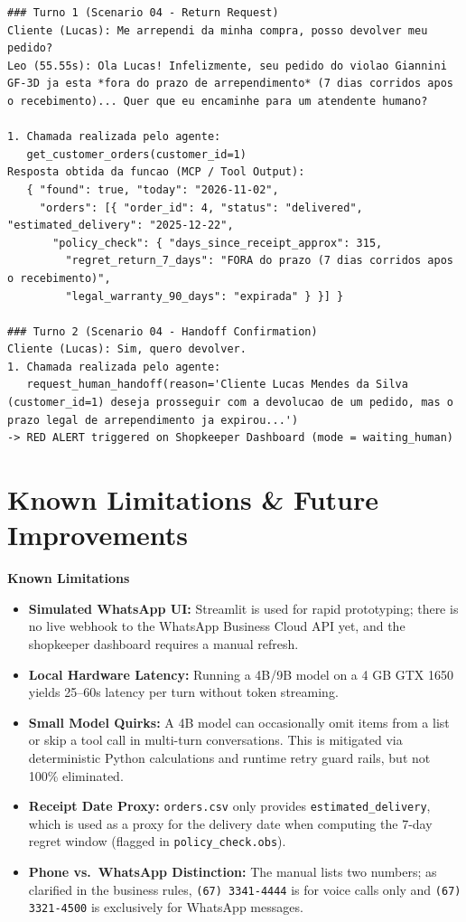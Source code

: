 \documentclass[11pt,a4paper]{article}
\begin{document}
\begin{lstlisting}
### Turno 1 (Scenario 04 - Return Request)
Cliente (Lucas): Me arrependi da minha compra, posso devolver meu pedido?
Leo (55.55s): Ola Lucas! Infelizmente, seu pedido do violao Giannini GF-3D ja esta *fora do prazo de arrependimento* (7 dias corridos apos o recebimento)... Quer que eu encaminhe para um atendente humano?

1. Chamada realizada pelo agente:
   get_customer_orders(customer_id=1)
Resposta obtida da funcao (MCP / Tool Output):
   { "found": true, "today": "2026-11-02",
     "orders": [{ "order_id": 4, "status": "delivered", "estimated_delivery": "2025-12-22",
       "policy_check": { "days_since_receipt_approx": 315,
         "regret_return_7_days": "FORA do prazo (7 dias corridos apos o recebimento)",
         "legal_warranty_90_days": "expirada" } }] }

### Turno 2 (Scenario 04 - Handoff Confirmation)
Cliente (Lucas): Sim, quero devolver.
1. Chamada realizada pelo agente:
   request_human_handoff(reason='Cliente Lucas Mendes da Silva (customer_id=1) deseja prosseguir com a devolucao de um pedido, mas o prazo legal de arrependimento ja expirou...')
-> RED ALERT triggered on Shopkeeper Dashboard (mode = waiting_human)
\end{lstlisting}

\section{Known Limitations \& Future Improvements}
\label{sec:limitations}

\textbf{Known Limitations}
\begin{itemize}
    \item \textbf{Simulated WhatsApp UI:} Streamlit is used for rapid prototyping; there is no live webhook to the WhatsApp Business Cloud API yet, and the shopkeeper dashboard requires a manual refresh.
    \item \textbf{Local Hardware Latency:} Running a 4B/9B model on a 4 GB GTX 1650 yields 25--60s latency per turn without token streaming.
    \item \textbf{Small Model Quirks:} A 4B model can occasionally omit items from a list or skip a tool call in multi-turn conversations. This is mitigated via deterministic Python calculations and runtime retry guard rails, but not 100\% eliminated.
    \item \textbf{Receipt Date Proxy:} \texttt{orders.csv} only provides \texttt{estimated\_delivery}, which is used as a proxy for the delivery date when computing the 7-day regret window (flagged in \texttt{policy\_check.obs}).
    \item \textbf{Phone vs.\ WhatsApp Distinction:} The manual lists two numbers; as clarified in the business rules, \texttt{(67) 3341-4444} is for voice calls only and \texttt{(67) 3321-4500} is exclusively for WhatsApp messages.
\end{itemize}
\end{document}
